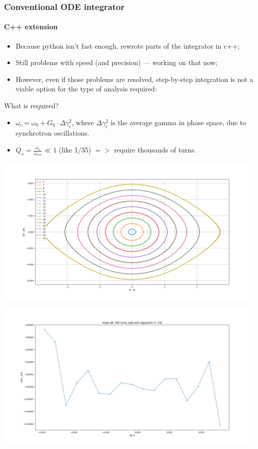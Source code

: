 \documentclass[pdf]{beamer}
\begin{document}
	\begin{frame}
		\frametitle{Conventional ODE integrator}
		\framesubtitle{C++ extension}
		\begin{itemize}
			\item Because python isn't fast enough, rewrote parts of the integrator in c++;
			\item Still problems with speed (and precision) --- working on that now;
			\item However, even if those problems are resolved, step-by-step integration is not a viable option for the type of analysis required:
		\end{itemize}
	\end{frame}
	\begin{frame}{What is required?}
			\begin{itemize}
				\item $\omega_i = \omega_0 + G_6\cdot\Delta\gamma_i^2$, where $\Delta\gamma_i^2$ is the average gamma in phase space, due to synchrotron oscillations.
				\item $Q_s = \frac{\omega_s}{\omega_{rev}} \ll 1$ (like 1/35) $=>$ require thousands of turns.
			\end{itemize}
		\centering
		\includegraphics[scale=.25]{mean_dK_test_fishplot}
	\end{frame}
	\begin{frame}
		\centering
		\includegraphics[scale=.3]{mean_dK_test_mean_dK_vs_dK0}
	\end{frame}
\end{document}
